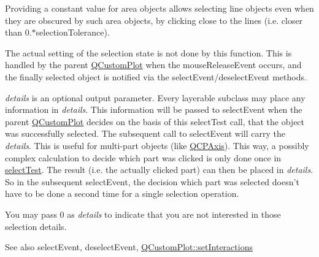 \-Providing a constant value for area objects allows selecting line objects even when they are obscured by such area objects, by clicking close to the lines (i.\-e. closer than 0.$\ast$selection\-Tolerance).

\-The actual setting of the selection state is not done by this function. \-This is handled by the parent \hyperlink{classQCustomPlot}{\-Q\-Custom\-Plot} when the mouse\-Release\-Event occurs, and the finally selected object is notified via the select\-Event/deselect\-Event methods.

{\itshape details\/} is an optional output parameter. \-Every layerable subclass may place any information in {\itshape details\/}. \-This information will be passed to select\-Event when the parent \hyperlink{classQCustomPlot}{\-Q\-Custom\-Plot} decides on the basis of this select\-Test call, that the object was successfully selected. \-The subsequent call to select\-Event will carry the {\itshape details\/}. \-This is useful for multi-\/part objects (like \hyperlink{classQCPAxis}{\-Q\-C\-P\-Axis}). \-This way, a possibly complex calculation to decide which part was clicked is only done once in \hyperlink{classQCPLayerable_a4001c4d0dfec55598efa4d531f2179a9}{select\-Test}. \-The result (i.\-e. the actually clicked part) can then be placed in {\itshape details\/}. \-So in the subsequent select\-Event, the decision which part was selected doesn't have to be done a second time for a single selection operation.

\-You may pass 0 as {\itshape details\/} to indicate that you are not interested in those selection details.

\begin{DoxySeeAlso}{\-See also}
select\-Event, deselect\-Event, \hyperlink{classQCustomPlot_a5ee1e2f6ae27419deca53e75907c27e5}{\-Q\-Custom\-Plot\-::set\-Interactions} 
\end{DoxySeeAlso}


